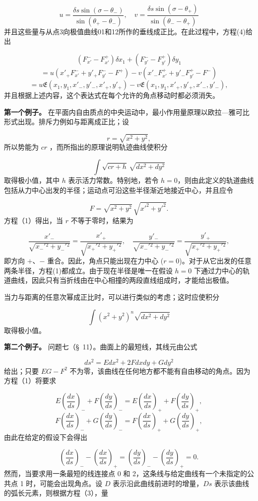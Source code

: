 \documentclass[11pt,a4paper,leqno]{article}
\begin{document}
\[
u=\frac{\delta s\sin(\sigma-\theta_{-})}{\sin(\theta_{+}-\theta_{-})},
\quad
v=\frac{\delta s\sin(\sigma-\theta_{+})}{\sin(\theta_{-}-\theta_{+})}
\]
并且这些量与从点3向极值曲线01和12所作的垂线成正比。在此过程中，方程(4)给出

\[
(F_{x'}^- -F_{x'}^+)\delta x_1+(F_{y'}^- -F_{y'}^+)\delta y_1
\]
\[
=u(x'_{+}F_{x'}^-+y'_{+}F_{y'}^- -F^+)-v(x'_{-}F_{x'}^+ + y'_{-}F_{y'}^+ -F^-)
\]
\[
=u\mathfrak{E}(x_1,y_1,x'_{-},y'_{-},x'_{+},y'_{+})
-v\mathfrak{E}(x_1,y_1,x'_{+},y'_{+},x'_{-},y'_{-}),
\]
并且根据上述内容，这个表达式在每个允许的角点移动时都必须消失。

\textbf{第一个例子。} 在平面内自由质点的中央运动中，最小作用量原理以欧拉—雅可比形式出现。排斥力例如与距离成正比；设

\[
r=\sqrt{x^2+y^2},
\]
所以势能为 $cr$ ，而所指出的原理说明轨迹曲线使积分

\[
\int \sqrt{cr+h}\,\sqrt{dx^2+dy^2}
\]
取得极小值，其中 $h$ 表示活力常数。特别地，若令 $h=0$，则由此定义的轨道曲线包括从力中心出发的半径；运动点可沿这些半径渐近地接近中心，并且应令

\[
F=\sqrt{x^2+y^2}\,\sqrt{x'^2+y'^2}.
\]
方程（1）得出，当 $r$ 不等于零时，结果为

\[
\frac{x'_{-}}{\sqrt{x_{-}'{}^2+y_{-}'{}^2}}
=
\frac{x'_{+}}{\sqrt{x_{+}'{}^2+y_{+}'{}^2}},
\quad
\frac{y'_{-}}{\sqrt{x_{-}'{}^2+y_{-}'{}^2}}
=
\frac{y'_{+}}{\sqrt{x_{+}'{}^2+y_{+}'{}^2}},
\]
即方向 $+$、$-$ 重合。因此，角点只能出现在力中心 ($r=0$)。对于从它出发的任意两条半径，方程(1)都成立。由于现在半径是唯一在假设 $h=0$ 下通过力中心的轨道曲线，因此只有当折线由在中心相撞的两段直线组成时，才能给出极值。

当力与距离的任意次幂成正比时，可以进行类似的考虑；这时应使积分

\[
\int (x^2+y^2)^n\sqrt{dx^2+dy^2}
\]
取得极小值。

\textbf{第二个例子。} 问题七（\S~11）。曲面上的最短线，其线元由公式

\[
ds^2=Edx^2+2Fdxdy+Gdy^2
\]
给出；只要 $EG-F^2$ 不为零，该曲线在任何地方都不能有自由移动的角点。因为方程（1）将要求

\[
E\left(\frac{dx}{ds}\right)_{-}+F\left(\frac{dy}{ds}\right)_{-}
=E\left(\frac{dx}{ds}\right)_{+}+F\left(\frac{dy}{ds}\right)_{+},
\]
\[
F\left(\frac{dx}{ds}\right)_{-}+G\left(\frac{dy}{ds}\right)_{-}
=F\left(\frac{dx}{ds}\right)_{+}+G\left(\frac{dy}{ds}\right)_{+},
\]
由此在给定的假设下会得出

\[
\left(\frac{dx}{ds}\right)_{-}-\left(\frac{dx}{ds}\right)_{+}
=
\left(\frac{dy}{ds}\right)_{-}-\left(\frac{dy}{ds}\right)_{+}=0.
\]
然而，当要求用一条最短的线连接点 0 和 2，这条线与给定曲线有一个未指定的公共点 1 时，可能会出现角点。设 $D$ 表示沿此曲线前进时的增量，$Ds$ 表示该曲线的弧长元素，则根据方程（3），量
\end{document}
